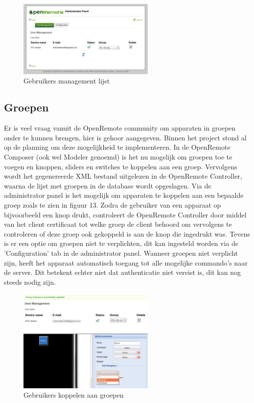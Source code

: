 \documentclass[]{article}
\begin{document}
\begin{figure}[htpb]
   \begin{center}
     \includegraphics[width=0.6\textwidth]{userlist.pdf}
   \end{center}
   \label{userlist}
   \caption{Gebruikers management lijst}
\end{figure}

\subsection{Groepen}
Er is veel vraag vanuit de OpenRemote community om apparaten in groepen onder te
kunnen brengen, hier is gehoor aangegeven. Binnen het project stond al op de
planning om deze mogelijkheid te implementeren. In de OpenRemote Composer (ook
wel Modeler genoemd) is het nu mogelijk om groepen toe te voegen en knoppen,
sliders en switches te koppelen aan een groep. Vervolgens wordt het gegenereerde
XML bestand uitgelezen in de OpenRemote Controller, waarna de lijst met groepen
in de database wordt opgeslagen. Via de administrator panel is het mogelijk om
apparaten te koppelen aan een bepaalde groep zoals te zien in figuur 13. Zodra
de gebruiker van een apparaat op bijvoorbeeld een knop drukt, controleert de
OpenRemote Controller door middel van het client certificaat tot welke groep de
client behoord om vervolgens te controleren of deze groep ook gekoppeld is aan
de knop die ingedrukt was. Tevens is er een optie om groepen niet te
verplichten, dit kan ingesteld worden via de 'Configuration' tab in de
administrator panel. Wanneer groepen niet verplicht zijn, heeft het apparaat
automatisch toegang tot alle mogelijke commando's naar de server. Dit betekent
echter niet dat authenticatie niet vereist is, dit kan nog steeds nodig zijn.

\begin{figure}[htpb]
   \begin{center}
     \includegraphics[width=0.6\textwidth]{usergroups.pdf}
   \end{center}
   \caption{Gebruikers koppelen aan groepen}
\end{figure}
\end{document}
